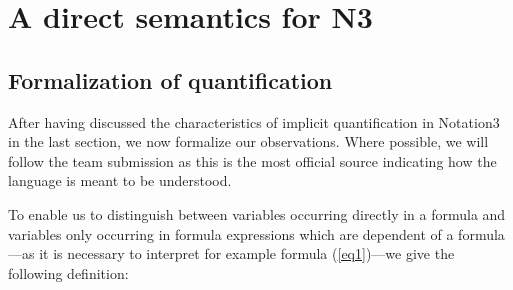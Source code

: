 \section{A direct semantics for N3}

\subsection{Formalization of quantification}\label{formal}
After having discussed the characteristics of implicit quantification in Notation3 in the last section, we now formalize our observations. 
Where possible, we will follow the team submission \cite{Notation3} as this is the most official source indicating how the language is meant to be understood.

To enable us to distinguish between variables occurring directly in a formula and variables only occurring in formula expressions which are dependent of a formula---as 
it is necessary to interpret for example formula (\ref{eq1})---we give the following definition: 








